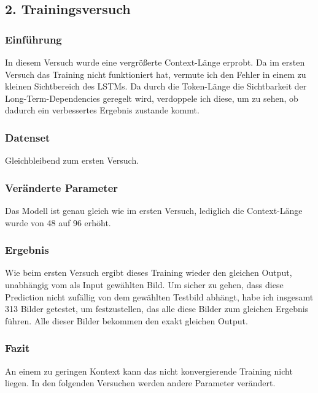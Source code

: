 \documentclass[pdftex,a4paper,halfparskip, article]{scrartcl}
\begin{document}
\subsection{2. Trainingsversuch}

\subsubsection*{Einführung}

In diesem Versuch wurde eine vergrößerte Context-Länge erprobt. Da im ersten Versuch das Training nicht funktioniert hat, vermute ich den Fehler in einem zu kleinen Sichtbereich des LSTMs. Da durch die Token-Länge die Sichtbarkeit der Long-Term-Dependencies geregelt wird, verdoppele ich diese, um zu sehen, ob dadurch ein verbessertes Ergebnis zustande kommt.

\subsubsection*{Datenset}

Gleichbleibend zum ersten Versuch.

\subsubsection*{Veränderte Parameter}

Das Modell ist genau gleich wie im ersten Versuch, lediglich die Context-Länge wurde von 48 auf 96 erhöht.

\subsubsection*{Ergebnis}

Wie beim ersten Versuch ergibt dieses Training wieder den gleichen Output, unabhängig vom als Input gewählten Bild. Um sicher zu gehen, dass diese Prediction nicht zufällig von dem gewählten Testbild abhängt, habe ich insgesamt 313 Bilder getestet, um festzustellen, das alle diese Bilder zum gleichen Ergebnis führen. Alle dieser Bilder bekommen den exakt gleichen Output.

\subsubsection*{Fazit}

An einem zu geringen Kontext kann das nicht konvergierende Training nicht liegen. In den folgenden Versuchen werden andere Parameter verändert.
\end{document}
